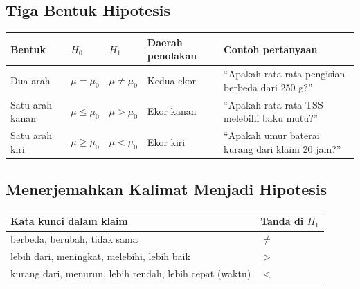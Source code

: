 \documentclass[
  indonesian,
  letterpaper,
]{book}
\newcounter{none} %
\begin{document}
\subsection{Tiga Bentuk Hipotesis}\label{tiga-bentuk-hipotesis}

{\def\LTcaptype{none} %
\begin{longtable}[]{@{}
  >{\raggedright\arraybackslash}p{}
  >{\raggedright\arraybackslash}p{}
  >{\raggedright\arraybackslash}p{}
  >{\raggedright\arraybackslash}p{}
  >{\raggedright\arraybackslash}p{}@{}}
\toprule\noalign{}
\begin{minipage}[b]{\linewidth}\raggedright
Bentuk
\end{minipage} & \begin{minipage}[b]{\linewidth}\raggedright
\(H_0\)
\end{minipage} & \begin{minipage}[b]{\linewidth}\raggedright
\(H_1\)
\end{minipage} & \begin{minipage}[b]{\linewidth}\raggedright
Daerah penolakan
\end{minipage} & \begin{minipage}[b]{\linewidth}\raggedright
Contoh pertanyaan
\end{minipage} \\
\midrule\noalign{}
\endhead
\bottomrule\noalign{}
\endlastfoot
Dua arah & \(\mu = \mu_0\) & \(\mu \ne \mu_0\) & Kedua ekor & ``Apakah
rata-rata pengisian berbeda dari 250 g?'' \\
Satu arah kanan & \(\mu \le \mu_0\) & \(\mu > \mu_0\) & Ekor kanan &
``Apakah rata-rata TSS melebihi baku mutu?'' \\
Satu arah kiri & \(\mu \ge \mu_0\) & \(\mu < \mu_0\) & Ekor kiri &
``Apakah umur baterai kurang dari klaim 20 jam?'' \\
\end{longtable}
}

\subsection{Menerjemahkan Kalimat Menjadi
Hipotesis}\label{menerjemahkan-kalimat-menjadi-hipotesis}

{\def\LTcaptype{none} %
\begin{longtable}[]{@{}ll@{}}
\toprule\noalign{}
Kata kunci dalam klaim & Tanda di \(H_1\) \\
\midrule\noalign{}
\endhead
\bottomrule\noalign{}
\endlastfoot
berbeda, berubah, tidak sama & \(\ne\) \\
lebih dari, meningkat, melebihi, lebih baik & \(>\) \\
kurang dari, menurun, lebih rendah, lebih cepat (waktu) & \(<\) \\
\end{longtable}
}
\end{document}
